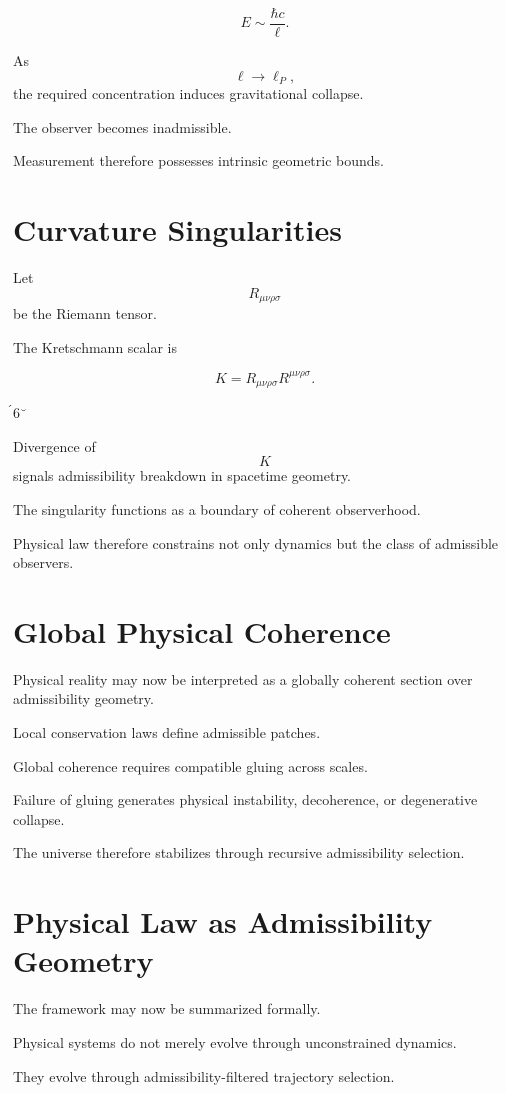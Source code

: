 \documentclass[12pt,openany]{book}
\theoremstyle{plain}
\theoremstyle{definition}
\theoremstyle{remark}
\begin{document}
\[
E
\sim
\frac{\hbar c}{\ell}.
\]

As
\[
\ell\to\ell_P,
\]
the required concentration induces gravitational collapse.

The observer becomes inadmissible.

Measurement therefore possesses intrinsic geometric bounds.

\section{Curvature Singularities}

Let
\[
R_{\mu\nu\rho\sigma}
\]
be the Riemann tensor.

The Kretschmann scalar is

\[
K
=
R_{\mu\nu\rho\sigma}
R^{\mu\nu\rho\sigma}.
\]

6

Divergence of
\[
K
\]
signals admissibility breakdown in spacetime geometry.

The singularity functions as a boundary of coherent observerhood.

Physical law therefore constrains not only dynamics but the class
of admissible observers.

\section{Global Physical Coherence}

Physical reality may now be interpreted as a globally coherent
section over admissibility geometry.

Local conservation laws define admissible patches.

Global coherence requires compatible gluing across scales.

Failure of gluing generates physical instability, decoherence,
or degenerative collapse.

The universe therefore stabilizes through recursive admissibility
selection.

\section{Physical Law as Admissibility Geometry}

The framework may now be summarized formally.

Physical systems do not merely evolve through unconstrained
dynamics.

They evolve through admissibility-filtered trajectory selection.
\end{document}
